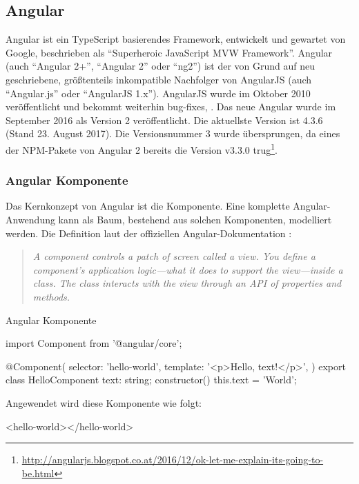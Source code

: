 \subsection{Angular}
\label{sec:angular}
Angular ist ein TypeScript basierendes Framework, entwickelt und gewartet von Google, beschrieben als "`Superheroic JavaScript MVW Framework"'. Angular (auch "`Angular 2+"', "`Angular 2"' oder "`ng2"') ist der von Grund auf neu geschriebene, größtenteils inkompatible Nachfolger von AngularJS (auch "`Angular.js"' oder "`AngularJS 1.x"').
AngularJS wurde im Oktober 2010 veröffentlicht und bekommt weiterhin bug-fixes, \etc. Das neue Angular wurde im September 2016 als Version 2 veröffentlicht. Die aktuellste Version ist 4.3.6 (Stand 23. August 2017). Die Versionsnummer 3 wurde übersprungen, da eines der NPM-Pakete von Angular 2 bereits die Version v3.3.0 trug\footnote{\url{http://angularjs.blogspot.co.at/2016/12/ok-let-me-explain-its-going-to-be.html}}.

\subsubsection{Angular Komponente}
Das Kernkonzept von Angular ist die Komponente. Eine komplette Angular-Anwendung kann als Baum, bestehend aus solchen Komponenten, modelliert werden.
Die Definition laut der offiziellen Angular-Dokumentation \cite{angular-component}: 
\begin{quote}
	\begin{english}
		\textit{A component controls a patch of screen called a view. You define a component's application logic—what it does to support the view—inside a class. The class interacts with the view through an API of properties and methods.}
	\end{english}
\end{quote}

\begin{program}[!htbp]
\caption{Angular Komponente}
\begin{JsCode}
	import { Component } from '@angular/core';
	
	@Component({
		selector: 'hello-world',
		template: '<p>Hello, {{text}}!</p>',
	})
	export class HelloComponent {
		text: string;
		constructor() {
			this.text = 'World';
		}
	}
\end{JsCode}
\end{program}
Angewendet wird diese Komponente wie folgt:
\begin{JsCode}[numbers=none]
<hello-world></hello-world>
\end{JsCode}


